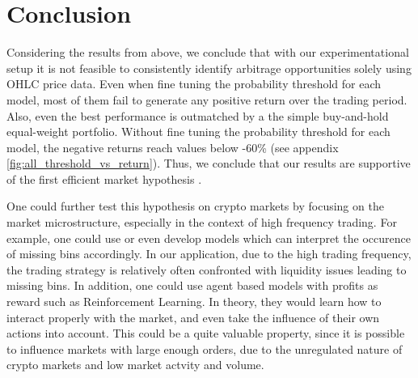 \section{Conclusion}
Considering the results from above, we conclude that with our experimentational setup it is not feasible to consistently identify arbitrage opportunities
solely using OHLC price data. Even when fine tuning the probability threshold for each model, most of them fail to generate any positive return over the trading period.
Also, even the best performance is outmatched by a the simple buy-and-hold equal-weight portfolio.
Without fine tuning the probability threshold for each model, the negative returns reach values below -60\% (see appendix \ref{fig:all_threshold_vs_return}).
Thus, we conclude that our results are supportive of the first efficient market hypothesis \cite{fama1970marketHypothesis}.

One could further test this hypothesis on crypto markets by focusing on the market microstructure, especially in the context of high frequency trading.
For example, one could use or even develop models which can interpret the occurence of missing bins accordingly.
In our application, due to the high trading frequency, the trading strategy is relatively often confronted with liquidity issues leading to missing bins.
In addition, one could use agent based models with profits as reward such as Reinforcement Learning. 
In theory, they would learn how to interact properly with the market, and even take the influence of their own actions into account.
This could be a quite valuable property, since it is possible to influence markets with large enough orders,
due to the unregulated nature of crypto markets and low market actvity and volume.



